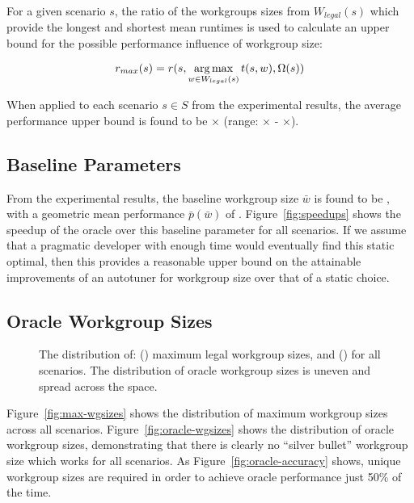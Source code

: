 For a given scenario $s$, the ratio of the workgroups sizes from
$W_{legal}(s)$ which provide the longest and shortest mean runtimes is
used to calculate an upper bound for the possible performance
influence of workgroup size:

\begin{equation}
r_{max}(s) = r(s, \operatorname*{arg\,max}_{w \in W_{legal}(s)} t(s,w), \Omega(s))
\end{equation}

When applied to each scenario $s \in S$ from the experimental results,
the average performance upper bound is found to be
$\times$ (range:
$\times$ -
$\times$).



\subsection{Baseline Parameters}

From the experimental results, the baseline workgroup size $\bar{w}$
is found to be , with a geometric mean performance
$\bar{p}(\bar{w})$ of
. Figure~\ref{fig:speedups} shows the speedup of
the oracle over this baseline parameter for all scenarios. If we
assume that a pragmatic developer with enough time would eventually
find this static optimal, then this provides a reasonable upper bound
on the attainable improvements of an autotuner for workgroup size over
that of a static choice.


\subsection{Oracle Workgroup Sizes}

\begin{figure}

\caption{%
  The distribution of: () maximum legal
  workgroup sizes, and () for all
  scenarios. The distribution of oracle workgroup sizes is uneven and
  spread across the space. %
}
\label{fig:heatmaps}
\end{figure}

Figure~\ref{fig:max-wgsizes} shows the distribution of maximum
workgroup sizes across all scenarios. Figure~\ref{fig:oracle-wgsizes}
shows the distribution of oracle workgroup sizes, demonstrating that
there is clearly no ``silver bullet'' workgroup size which works for
all scenarios. As Figure~\ref{fig:oracle-accuracy} shows,
 unique workgroup sizes are
required in order to achieve oracle performance just 50\% of the
time.

